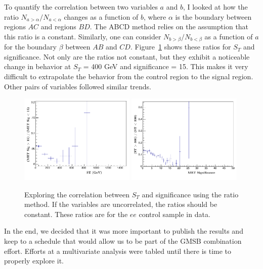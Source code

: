 To quantify the correlation between two variables $a$ and $b$, I looked at how the ratio 
$N_{a > \alpha}/N_{a < \alpha}$ changes as a function of $b$, where $\alpha$ is the boundary between
regions $AC$ and regions $BD$. The ABCD method relies on the assumption
that this ratio is a constant.
Similarly, one can consider $N_{b > \beta}/N_{b < \beta}$ as a function 
of $a$ for the boundary $\beta$ between $AB$ and $CD$. Figure~\ref{fig:kappa} shows these ratios 
for $S_T$ and \ETmiss significance. Not only are the ratios not constant,
but they exhibit a noticeable change in behavior at $S_T$ = 400 GeV and \ETmiss 
significance = 15. This makes it very difficult to extrapolate the behavior from the control
region to the signal region. Other pairs of variables followed similar trends. 

\begin{figure}[h]
\begin{center}
\includegraphics[width=0.49\textwidth]{Figures/Appendix/kappa1.pdf}
\includegraphics[width=0.49\textwidth]{Figures/Appendix/kappa2.pdf}
\end{center}
\caption[Exploring the correlation between $S_T$ and \ETmiss significance using
the ratio method.]
{Exploring the correlation between $S_T$ and \ETmiss significance using
the ratio method. If the variables are uncorrelated, the ratios should be constant. These
ratios are for the $ee$ control sample in data.}
\label{fig:kappa}
\end{figure}

In the end, we decided that it was more important to publish the results and keep to 
a schedule that would allow us to be part of the GMSB combination effort. Efforts at a 
multivariate analysis were tabled until there is time to properly explore it.


